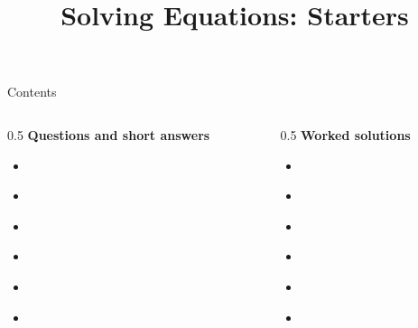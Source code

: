 \documentclass{beamer}
\title{Solving Equations: Starters}
\author{}
\date{}
\begin{document}
\frame{\titlepage}

\begin{frame}{Contents}
\small
\begin{columns}[T]
\begin{column}{0.5\textwidth}
\textbf{Questions and short answers}
\begin{itemize}
\item \hyperlink{q-st1}{}
\item \hyperlink{q-st2}{}
\item \hyperlink{q-st3}{}
\item \hyperlink{q-st4}{}
\item \hyperlink{q-st5}{}
\item \hyperlink{q-st6}{}
\end{itemize}
\end{column}
\begin{column}{0.5\textwidth}
\textbf{Worked solutions}
\begin{itemize}
\item \hyperlink{work-st1}{}
\item \hyperlink{work-st2}{}
\item \hyperlink{work-st3}{}
\item \hyperlink{work-st4}{}
\item \hyperlink{work-st5}{}
\item \hyperlink{work-st6}{}
\end{itemize}
\end{column}
\end{columns}
\end{frame}
\end{document}
